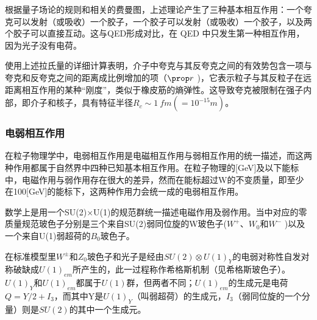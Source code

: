 根据量子场论的规则和相关的费曼图，上述理论产生了三种基本相互作用：一个夸克可以发射（或吸收）一个胶子，一个胶子可以发射（或吸收）一个胶子，以及两个胶子可以直接互动。这与QED形成对比，在 QED 中只发生第一种相互作用，因为光子没有电荷。

使用上述拉氏量的详细计算表明，介子中夸克与其反夸克之间的有效势包含一项与夸克和反夸克之间的距离成比例增加的项（$\prop r$ )，它表示粒子与其反粒子在远距离相互作用的某种“刚度”，类似于橡皮筋的熵弹性。这导致夸克被限制在强子内部，即介子和核子，具有特征半径$R_c\sim\SI{1}{fm}(=10^{-15}\si{m})$。

\subsubsection{电弱相互作用}
在粒子物理学中，电弱相互作用是电磁相互作用与弱相互作用的统一描述，而这两种作用都属于自然界中四种已知基本相互作用。在粒子物理的[GeV]及以下能标中，电磁作用与弱作用存在很大的差异，然而在能标超过W的不变质量，即至少在100[GeV]的能标下，这两种作用力会统一成的电弱相互作用。

数学上是用一个SU(2)×U(1)的规范群统一描述电磁作用及弱作用。当中对应的零质量规范玻色子分别是三个来自SU(2)弱同位旋的W玻色子($W^+$、$W_0$和$W^−$
)以及一个来自U(1)弱超荷的$B_0$玻色子。

在标准模型里$W^±$和$Z_0$玻色子和光子是经由$SU(2)\otimes U(1)_Y$的电弱对称性自发对称破缺成$U(1)_{em}$所产生的，此一过程称作希格斯机制（见希格斯玻色子）。$U(1)_Y$和$U(1)_{em}$都属于$U(1)$群，但两者不同；$U(1)_{em}$的生成元是电荷$Q=Y/2+I_3$，而其中Y是$U(1)_Y$（叫弱超荷）的生成元，$I_3$（弱同位旋的一个分量）则是$SU(2)$的其中一个生成元。

